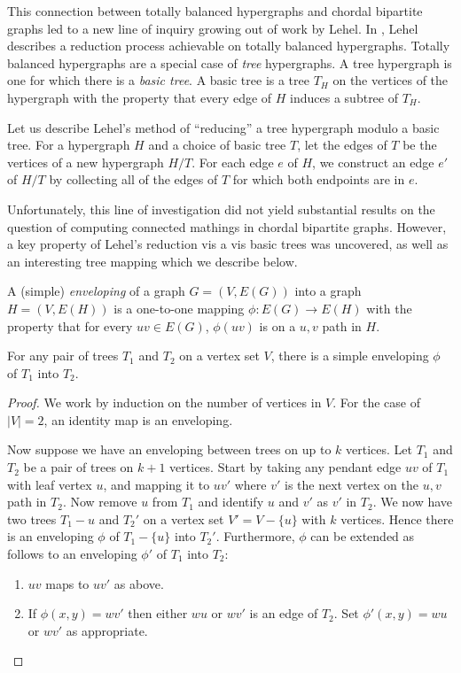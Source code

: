 This connection between totally balanced hypergraphs and chordal bipartite graphs led to a new line of inquiry growing out of work by Lehel.  In \cite{Lehel}, Lehel describes a reduction process achievable on totally balanced hypergraphs.  Totally balanced hypergraphs are a special case of {\it tree} hypergraphs.  A tree hypergraph is one for which there is a {\it basic tree}.  A basic tree is a tree $T_H$ on the vertices of the hypergraph with the property that every edge of $H$ induces a subtree of $T_H$. 


Let us describe Lehel's method of ``reducing'' a tree hypergraph modulo a basic tree.  For a hypergraph $H$ and a choice of  basic tree $T$, let the edges of $T$ be the vertices of a new hypergraph $H/T$.  For each edge $e$ of $H$, we construct an edge $e'$ of $H/T$ by collecting all of the edges of $T$ for which both endpoints are in $e$.  


Unfortunately, this line of investigation did not yield substantial results on the question of computing connected mathings in chordal bipartite graphs.  However, a key property of Lehel's reduction vis a vis basic trees was uncovered, as well as an interesting tree mapping which we describe below.

A (simple) {\it enveloping} of a graph $G = (V, E(G))$ into a graph $H = (V, E(H))$ is a one-to-one mapping $\phi: E(G) \rightarrow E(H)$ with the property that for every $uv \in E(G)$, $\phi(uv)$ is on a $u,v$ path in $H$.

\begin{theorem}
For any pair of trees $T_1$ and $T_2$ on a vertex set $V$, there is a simple enveloping $\phi$ of $T_1$ into $T_2$.
\end{theorem}

\begin{proof}
We work by induction on the number of vertices in $V$.  For the case of $|V| = 2$, an identity map is an enveloping. 	

Now suppose we have an enveloping between trees on up to $k$ vertices.  Let $T_1$ and $T_2$ be a pair of trees on $k+1$ vertices.  Start by taking any pendant edge $uv$ of $T_1$ with leaf vertex $u$, and mapping it to $uv'$ where $v'$ is the next vertex on the $u,v$ path in $T_2$.  Now remove $u$ from $T_1$ and identify $u$ and $v'$ as $v'$ in $T_2$.  We now have two trees $T_1 - u$ and $T_2'$ on a vertex set $V' = V-\{u\}$ with $k$ vertices.  Hence there is an enveloping $\phi$ of $T_1-\{u\}$ into $T_2'$.  Furthermore, $\phi$ can be extended  as follows to an enveloping $\phi '$ of $T_1$ into $T_2$:
\begin{enumerate}
	\item $uv$ maps to $uv'$ as above. 
	\item If $\phi(x,y)  = wv'$ then either $wu$ or $wv'$ is an edge of $T_2$.  Set $\phi'(x,y) = wu$ or $wv'$ as appropriate.
\end{enumerate} 
\end{proof}

